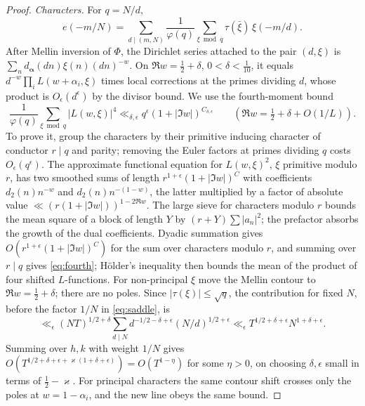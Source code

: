 \documentclass[11pt,colorlinks]{charlie}
\begin{document}
\begin{proof}
\emph{Characters.} For $q=N/d$,
\[
 e(-m/N)=\sum_{d\mid(m,N)}\frac1{\varphi(q)}\sum_{\xi\bmod q}\tau(\bar\xi)\,\xi(-m/d).
\]
After Mellin inversion of $\Phi$, the Dirichlet series attached to the pair $(d,\xi)$ is $\sum_nd_{\boldsymbol\alpha}(dn)\xi(n)(dn)^{-w}$. On $\Re w=\frac12+\delta$, $0<\delta<\frac1{10}$, it equals $d^{-w}\prod_iL(w+\alpha_i,\xi)$ times local corrections at the primes dividing $d$, whose product is $O_\epsilon(d^\epsilon)$ by the divisor bound. We use the fourth-moment bound
\begin{equation}\label{eq:fourth}
 \frac1{\varphi(q)}\sum_{\xi\bmod q}|L(w,\xi)|^4\ll_{\delta,\epsilon}q^\epsilon(1+|\Im w|)^{C_{\delta,\epsilon}}\qquad(\Re w=\tfrac12+\delta+O(1/L)).
\end{equation}
To prove it, group the characters by their primitive inducing character of conductor $r\mid q$ and parity; removing the Euler factors at primes dividing $q$ costs $O_\epsilon(q^\epsilon)$. The approximate functional equation for $L(w,\xi)^2$, $\xi$ primitive modulo $r$, has two smoothed sums of length $r^{1+\epsilon}(1+|\Im w|)^{C}$ with coefficients $d_2(n)n^{-w}$ and $d_2(n)n^{-(1-w)}$, the latter multiplied by a factor of absolute value $\ll(r(1+|\Im w|))^{1-2\Re w}$. The large sieve for characters modulo $r$ bounds the mean square of a block of length $Y$ by $(r+Y)\sum|a_n|^2$; the prefactor absorbs the growth of the dual coefficients. Dyadic summation gives $O(r^{1+\epsilon}(1+|\Im w|)^C)$ for the sum over characters modulo $r$, and summing over $r\mid q$ gives \eqref{eq:fourth}; H\"older's inequality then bounds the mean of the product of four shifted $L$-functions. For non-principal $\xi$ move the Mellin contour to $\Re w=\frac12+\delta$; there are no poles. Since $|\tau(\xi)|\le\sqrt q$, the contribution for fixed $N$, before the factor $1/N$ in \eqref{eq:saddle}, is
\[
 \ll_\epsilon(NT)^{1/2+\delta}\sum_{d\mid N}d^{-1/2-\delta+\epsilon}(N/d)^{1/2+\epsilon}\ll_\epsilon T^{1/2+\delta+\epsilon}N^{1+\delta+\epsilon}.
\]
Summing over $h,k$ with weight $1/N$ gives $O(T^{1/2+\delta+\epsilon+\varkappa(1+\delta+\epsilon)})=O(T^{1-\eta})$ for some $\eta>0$, on choosing $\delta,\epsilon$ small in terms of $\frac12-\varkappa$. For principal characters the same contour shift crosses only the poles at $w=1-\alpha_i$, and the new line obeys the same bound.


\end{proof}
\end{document}
